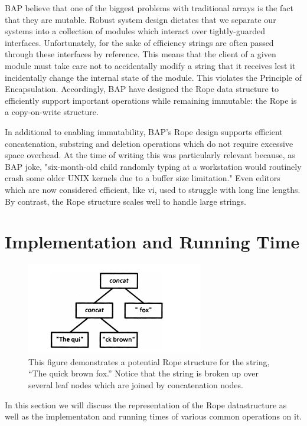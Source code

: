 \documentclass[12pt]{article}
\begin{document}
BAP believe that one of the biggest problems with traditional arrays is the fact that they are mutable. Robust system design dictates that we separate our systems into a collection of modules which interact over tightly-guarded interfaces. Unfortunately, for the sake of efficiency strings are often passed through these interfaces by reference. This means that the client of a given module must take care not to accidentally modify a string that it receives lest it incidentally change the internal state of the module. This violates the Principle of Encapsulation. Accordingly, BAP have designed the Rope data structure to efficiently support important operations while remaining immutable: the Rope is a copy-on-write structure.

In additional to enabling immutability, BAP's Rope design supports efficient concatenation, substring and deletion operations which do not require excessive space overhead. At the time of writing this was particularly relevant because, as BAP joke, "six-month-old child randomly typing at a workstation would routinely crash some older UNIX kernels due to a buffer size limitation." Even editors which are now considered efficient, like vi, used to struggle with long line lengths. By contrast, the Rope structure scales well to handle large strings.

\section{Implementation and Running Time}

\begin{figure}[t]
\begin{centering}
\includegraphics[scale=0.75]{simple_rope}
\caption{This figure demonstrates a potential Rope structure for the string, ``The quick brown fox.'' Notice that the string is broken up over several leaf nodes which are joined by concatenation nodes.}\label{representation}
\end{centering}
\end{figure}

In this section we will discuss the representation of the Rope datastructure as well as the implementaton and running times of various common operations on it.
\end{document}
